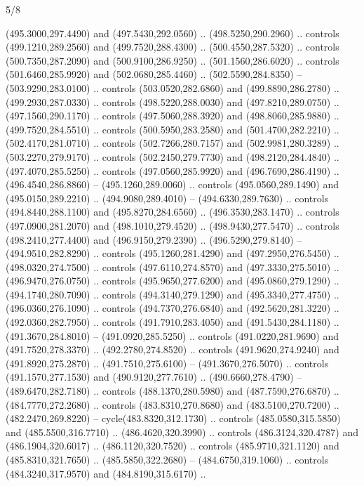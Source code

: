 \begin{flagdescription}{5/8}
\begin{scope}[xshift=0.5\flaglength,yshift=0.5\flagwidth,scale=\flagwidth/475.63]
\begin{scope}[y=0.8pt, x=0.8pt, yscale=-1, xscale=1,shift={(-450,-300)}]
\begin{scope}[cm={{1.0,0.0,0.0,1.0,(-0.0002,0.12556)}},cm={{1.0,0.0,0.0,1.0,(0.00179,0.0)}}]
  (495.3000,297.4490) and (497.5430,292.0560) .. (498.5250,290.2960) .. controls
  (499.1210,289.2560) and (499.7520,288.4300) .. (500.4550,287.5320) .. controls
  (500.7350,287.2090) and (500.9100,286.9250) .. (501.1560,286.6020) .. controls
  (501.6460,285.9920) and (502.0680,285.4460) .. (502.5590,284.8350) --
  (503.9290,283.0100) .. controls (503.0520,282.6860) and (499.8890,286.2780) ..
  (499.2930,287.0330) .. controls (498.5220,288.0030) and (497.8210,289.0750) ..
  (497.1560,290.1170) .. controls (497.5060,288.3920) and (498.8060,285.9880) ..
  (499.7520,284.5510) .. controls (500.5950,283.2580) and (501.4700,282.2210) ..
  (502.4170,281.0710) .. controls (502.7266,280.7157) and (502.9981,280.3289) ..
  (503.2270,279.9170) .. controls (502.2450,279.7730) and (498.2120,284.4840) ..
  (497.4070,285.5250) .. controls (497.0560,285.9920) and (496.7690,286.4190) ..
  (496.4540,286.8860) -- (495.1260,289.0060) .. controls (495.0560,289.1490) and
  (495.0150,289.2210) .. (494.9080,289.4010) -- (494.6330,289.7630) .. controls
  (494.8440,288.1100) and (495.8270,284.6560) .. (496.3530,283.1470) .. controls
  (497.0900,281.2070) and (498.1010,279.4520) .. (498.9430,277.5470) .. controls
  (498.2410,277.4400) and (496.9150,279.2390) .. (496.5290,279.8140) --
  (494.9510,282.8290) .. controls (495.1260,281.4290) and (497.2950,276.5450) ..
  (498.0320,274.7500) .. controls (497.6110,274.8570) and (497.3330,275.5010) ..
  (496.9470,276.0750) .. controls (495.9650,277.6200) and (495.0860,279.1290) ..
  (494.1740,280.7090) .. controls (494.3140,279.1290) and (495.3340,277.4750) ..
  (496.0360,276.1090) .. controls (494.7370,276.6840) and (492.5620,281.3220) ..
  (492.0360,282.7950) .. controls (491.7910,283.4050) and (491.5430,284.1180) ..
  (491.3670,284.8010) -- (491.0920,285.5250) .. controls (491.0220,281.9690) and
  (491.7520,278.3370) .. (492.2780,274.8520) .. controls (491.9620,274.9240) and
  (491.8920,275.2870) .. (491.7510,275.6100) -- (491.3670,276.5070) .. controls
  (491.1570,277.1530) and (490.9120,277.7610) .. (490.6660,278.4790) --
  (489.6470,282.7180) .. controls (488.1370,280.5980) and (487.7590,276.6870) ..
  (484.7770,272.2680) .. controls (483.8310,270.8680) and (483.5100,270.7200) ..
  (482.2470,269.8220) -- cycle(483.8320,312.1730) .. controls
  (485.0580,315.5850) and (485.5500,316.7710) .. (486.4620,320.3990) .. controls
  (486.3124,320.4787) and (486.1904,320.6017) .. (486.1120,320.7520) .. controls
  (485.9710,321.1120) and (485.8310,321.7650) .. (485.5850,322.2680) --
  (484.6750,319.1060) .. controls (484.3240,317.9570) and (484.8190,315.6170) ..

\end{scope}
\end{scope}
\end{scope}
\end{flagdescription}
